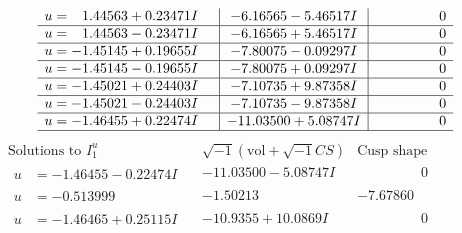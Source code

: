 \documentclass[1p]{elsarticle_modified}
\theoremstyle{definition}
\newcommand{\I}{\sqrt{-1}}
\begin{document}
$$\begin{array}{c|c|c}
\begin{aligned}
u &= \phantom{-}1.44563 + 0.23471 I\end{aligned}
 & -6.16565 - 5.46517 I & \phantom{-0.000000 } 0 \\ \hline\begin{aligned}
u &= \phantom{-}1.44563 - 0.23471 I\end{aligned}
 & -6.16565 + 5.46517 I & \phantom{-0.000000 } 0 \\ \hline\begin{aligned}
u &= -1.45145 + 0.19655 I\end{aligned}
 & -7.80075 - 0.09297 I & \phantom{-0.000000 } 0 \\ \hline\begin{aligned}
u &= -1.45145 - 0.19655 I\end{aligned}
 & -7.80075 + 0.09297 I & \phantom{-0.000000 } 0 \\ \hline\begin{aligned}
u &= -1.45021 + 0.24403 I\end{aligned}
 & -7.10735 + 9.87358 I & \phantom{-0.000000 } 0 \\ \hline\begin{aligned}
u &= -1.45021 - 0.24403 I\end{aligned}
 & -7.10735 - 9.87358 I & \phantom{-0.000000 } 0 \\ \hline\begin{aligned}
u &= -1.46455 + 0.22474 I\end{aligned}
 & -11.03500 + 5.08747 I & \phantom{-0.000000 } 0\\
 \hline 
 \end{array}$$\newpage$$\begin{array}{c|c|c}  
\text{Solutions to }I^u_{1}& \I (\text{vol} + \sqrt{-1}CS) & \text{Cusp shape}\\
 \hline 
\begin{aligned}
u &= -1.46455 - 0.22474 I\end{aligned}
 & -11.03500 - 5.08747 I & \phantom{-0.000000 } 0 \\ \hline\begin{aligned}
u &= -0.513999\phantom{ +0.000000I}\end{aligned}
 & -1.50213\phantom{ +0.000000I} & -7.67860\phantom{ +0.000000I} \\ \hline\begin{aligned}
u &= -1.46465 + 0.25115 I\end{aligned}
 & -10.9355 + 10.0869 I & \phantom{-0.000000 } 0 \\ \hline\begin{aligned}

\end{aligned}
\end{array}$$
\end{document}
